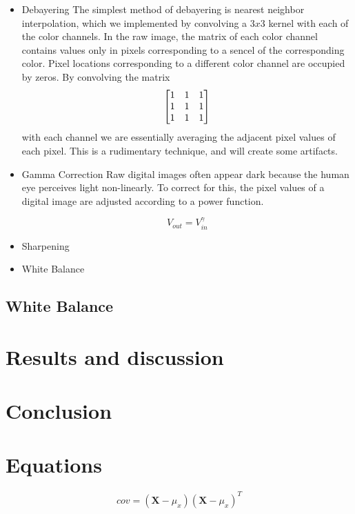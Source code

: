 \documentclass{article}
\begin{document}
\begin{itemize}
    \item Debayering
    The simplest method of debayering is nearest neighbor interpolation, which we implemented by convolving a  $3x3$ kernel with each of the color channels. In the raw image, the matrix of each color channel contains values only in pixels corresponding to a sencel of the corresponding color. Pixel locations corresponding to a different color channel are occupied by zeros. By convolving the matrix 
    \begin{align}
        \begin{bmatrix} 1 & 1 & 1 \\ 1 & 1 & 1 \\ 1 & 1 & 1 \end{bmatrix}
    \end{align}
    with each channel we are essentially averaging the adjacent pixel values of each pixel. This is a rudimentary technique, and will create some artifacts. 
    \item Gamma Correction
    Raw digital images often appear dark because the human eye perceives light non-linearly. To correct for this, the pixel values of a digital image are adjusted according to a power function. 

    \begin{equation}
        V_{out} = V_{in}^{\gamma}
    \end{equation}
    
    \item Sharpening
    \item White Balance 
\end{itemize}

\subsection{White Balance}

\section{Results and discussion}

\section{Conclusion}


\section{Equations} 
\begin{equation}
    cov = (\textbf{X} - \mu_{x})(\textbf{X} - \mu_{x})^{T}
\end{equation}
\end{document}
